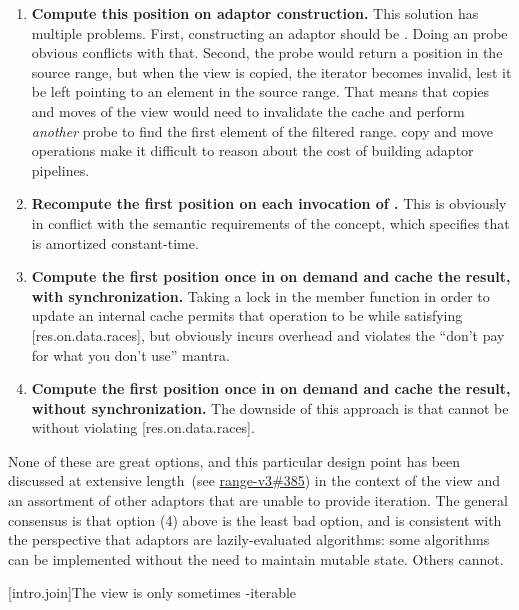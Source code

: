 {\begin{enumerate}
\item \textbf{Compute this position on adaptor construction.} This solution has
multiple problems. First, constructing an adaptor should be . Doing an
 probe obvious conflicts with that. Second, the probe would return a
position in the source range, but when the  view is copied, the
iterator becomes invalid, lest it be left pointing to an element in the source
range. That means that copies and moves of the  view would need to
invalidate the cache and perform \textit{another}  probe to find the first
element of the filtered range.  copy and move operations make it difficult
to reason about the cost of building adaptor pipelines.
\item \textbf{Recompute the first position on each invocation of .} This is
obviously in conflict with the semantic requirements of the  concept,
which specifies that  is amortized constant-time.
\item \textbf{Compute the first position once in  on demand and cache
the result, with synchronization.} Taking a lock in the  member
function in order to update an internal cache permits that operation to be
 while satisfying [res.on.data.races], but obviously incurs overhead
and violates the ``don't pay for what you don't use'' mantra.
\item \textbf{Compute the first position once in  on demand and cache
the result, without synchronization.} The downside of this approach is that
 cannot be  without violating [res.on.data.races].
\end{enumerate}

\pnum
None of these are great options, and this particular design point has been
discussed at extensive length~(see
\href{https://github.com/ericniebler/range-v3/issues/385}{range-v3\#385})
in the context of the  view and an assortment of other adaptors
that are unable to provide  iteration. The general consensus is
that option (4) above is the least bad option, and is consistent with the
perspective that adaptors are lazily-evaluated algorithms: some algorithms can
be implemented without the need to maintain mutable state. Others cannot.

[intro.join]{The  view is only sometimes -iterable}

}
